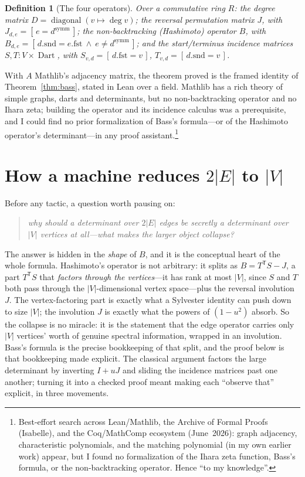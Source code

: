 \documentclass[11pt]{article}
\newtheorem{definition}{Definition}
\DeclareMathOperator{\Dart}{Dart}
\begin{document}
\begin{definition}[The four operators]
Over a commutative ring $R$: the \emph{degree matrix}
$D=\operatorname{diagonal}(v\mapsto\deg v)$; the \emph{reversal} permutation matrix $J$, with
$J_{d,e}=[\,e=d^{\mathrm{symm}}\,]$; the \emph{non-backtracking} (Hashimoto) operator $B$, with
$B_{d,e}=[\,d.\mathrm{snd}=e.\mathrm{fst}\ \wedge\ e\neq d^{\mathrm{symm}}\,]$; and the
start/terminus incidence matrices $S,T\colon V\times\Dart$, with $S_{v,d}=[\,d.\mathrm{fst}=v\,]$,
$T_{v,d}=[\,d.\mathrm{snd}=v\,]$.
\end{definition}

With $A$ Mathlib's adjacency matrix, the theorem proved is the framed identity of
Theorem~\ref{thm:bass}, stated in Lean over a field. Mathlib has a rich theory of simple graphs,
darts and determinants, but no non-backtracking operator and no Ihara zeta; building the operator
and its incidence calculus was a prerequisite, and I could find no prior formalization of Bass's
formula---or of the Hashimoto operator's determinant---in any proof assistant.\footnote{Best-effort
search across Lean/Mathlib, the Archive of Formal Proofs (Isabelle), and the Coq/MathComp ecosystem
(June~2026): graph adjacency, characteristic polynomials, and the matching polynomial (in my own
earlier work) appear, but I found no formalization of the Ihara zeta function, Bass's formula, or
the non-backtracking operator. Hence ``to my knowledge''.}

\section{How a machine reduces $2|E|$ to $|V|$}
\label{sec:proof}

Before any tactic, a question worth pausing on:
\begin{quote}\itshape
  why should a determinant over $2|E|$ edges be secretly a determinant over $|V|$ vertices at
  all---what makes the larger object collapse?
\end{quote}
The answer is hidden in the \emph{shape} of $B$, and it is the conceptual heart of the whole
formula. Hashimoto's operator is not arbitrary: it splits as $B=T^{\mathsf T}S-J$, a part
$T^{\mathsf T}S$ that \emph{factors through the vertices}---it has rank at most $|V|$, since $S$ and
$T$ both pass through the $|V|$-dimensional vertex space---plus the reversal involution $J$. The
vertex-factoring part is exactly what a Sylvester identity can push down to size $|V|$; the
involution $J$ is exactly what the powers of $(1-u^2)$ absorb. So the collapse is no miracle: it is
the statement that the edge operator carries only $|V|$ vertices' worth of genuine spectral
information, wrapped in an involution. Bass's formula is the precise bookkeeping of that split, and
the proof below is that bookkeeping made explicit. The classical argument factors the large
determinant by inverting $I+uJ$ and sliding the incidence matrices past one another; turning it into
a checked proof meant making each ``observe that'' explicit, in three movements.
\end{document}
